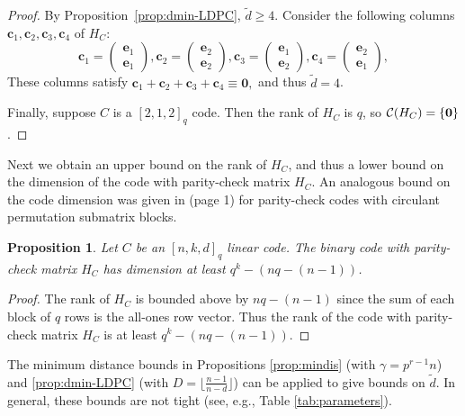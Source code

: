 \documentclass[11pt]{amsart}
\newtheorem{proposition}[theorem]{Proposition}
\theoremstyle{definition}
\newcommand{\0}{\mathbf{0}}
\newcommand{\C}{\mathcal{C}}
\begin{document}
\begin{proof}
    By Proposition~\ref{prop:dmin-LDPC}, $\tilde{d}\geq 4$. Consider the following columns $\mathbf{c}_1, \mathbf{c}_2, \mathbf{c}_3, \mathbf{c}_4$ of $H_C$: 
    \[\mathbf{c}_1=\begin{pmatrix}\mathbf{e}_1\\ \mathbf{e}_1\end{pmatrix}, \mathbf{c}_2=\begin{pmatrix}\mathbf{e}_2\\ \mathbf{e}_2\end{pmatrix}, \mathbf{c}_3=\begin{pmatrix}\mathbf{e}_1\\ \mathbf{e}_2\end{pmatrix}, \mathbf{c}_4=\begin{pmatrix}\mathbf{e}_2\\ \mathbf{e}_1\end{pmatrix}, \]
    These columns satisfy 
    $\mathbf{c}_1 + \mathbf{c}_2+\mathbf{c}_3 +\mathbf{c}_4\equiv \mathbf{0},$ 
    and thus $\tilde{d}=4$. 

    Finally, suppose $C$ is a $[2, 1, 2]_q$  code. Then the rank of $H_C$ is $q$, so $\C(H_C)=\{\bf{0}\}$. 
\end{proof}

Next we obtain an upper bound on the rank of $H_C$, and thus 
a lower bound on the dimension of the code with parity-check matrix $H_C$. An analogous bound on the code dimension was given in \cite{fossorier2004quasicyclic} (page 1) for parity-check codes with circulant permutation submatrix blocks. 

\begin{proposition} \label{prop:dim-lower-bd}
    Let $C$ be an $[n, k, d]_q$ linear code. The binary code with parity-check matrix $H_C$ has dimension at least $q^k - (nq-(n-1))$.
\end{proposition}

\begin{proof}
    The rank of $H_C$ is bounded above by $nq-(n-1)$ since the sum of each block of $q$ rows is the all-ones row vector. Thus the rank of the code with parity-check matrix $H_C$ is at least $q^k-(nq-(n-1))$. 
\end{proof}

The minimum distance bounds in Propositions \ref{prop:mindis} (with $\gamma=p^{r-1}n$)  and \ref{prop:dmin-LDPC} (with $D=\lfloor\frac{n-1}{n-d}\rfloor$) can be applied to give bounds on $\tilde{d}$. In general, these bounds are not tight (see, e.g., Table \ref{tab:parameters}). 
\end{document}
